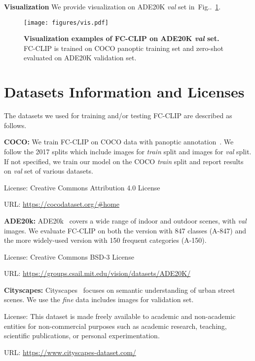 \documentclass{article}
\makeatletter
\DeclareRobustCommand\onedot{\futurelet\@let@token\@onedot}
\def\@onedot{\ifx\@let@token.\else.\null\fi\xspace}
\newcommand{\figref}[1]{Fig\onedot~\ref{#1}}
\newcommand{\modelname}{FC-CLIP\xspace}
\makeatother
\begin{document}
\noindent \textbf{Visualization}\quad
We provide visualization on ADE20K \textit{val} set in~\figref{fig:ade20k_vis}.

\begin{figure}
    \centering
    \texttt{[image: figures/vis.pdf]}
    \vspace{-12ex}
    \caption{
    \textbf{Visualization examples of \modelname on ADE20K \textit{val} set.} \modelname is trained on COCO panoptic training set and zero-shot evaluated on ADE20K validation set.
    }
    \label{fig:ade20k_vis}
\end{figure}

\section{Datasets Information and Licenses}
The datasets we used for training and/or testing \modelname are described as follows.


\noindent\textbf{COCO:}\quad
We train \modelname on COCO data with panoptic annotation~\cite{lin2014microsoft}. We follow the 2017 splits which include  images for \textit{train} split and  images for \textit{val} split. If not specified, we train our model on the COCO \textit{train} split and report results on \textit{val} set of various datasets.

License: Creative Commons Attribution 4.0 License

URL: \url{https://cocodataset.org/#home}

\noindent\textbf{ADE20k:}\quad
ADE20k~\cite{zhou2017scene} covers a wide range of indoor and outdoor scenes, with  \textit{val} images. We evaluate \modelname on both the version with 847 classes (A-847) and the more widely-used version with 150 frequent categories (A-150).

License: Creative Commons BSD-3 License

URL: \url{https://groups.csail.mit.edu/vision/datasets/ADE20K/}

\noindent\textbf{Cityscapes:}\quad
Cityscapes~\cite{Cordts2016Cityscapes} focuses on semantic understanding of urban street scenes. We use the \textit{fine} data includes  images for validation set.

License: This dataset is made freely available to academic and non-academic entities for non-commercial purposes such as academic research, teaching, scientific publications, or personal experimentation.

URL: \url{https://www.cityscapes-dataset.com/}
\end{document}
